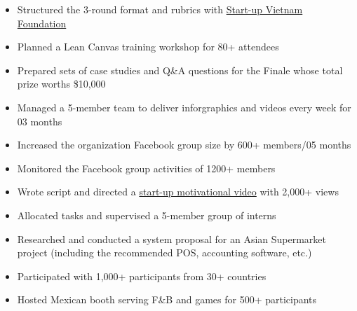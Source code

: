 \documentclass[10pt,a4paper,ragged2e]{altacv}
\begin{document}
\vskip 0.2in


\begin{itemize}
	\item Structured the 3-round format and rubrics with {\href{https://svf.org.vn/}{Start-up Vietnam Foundation}} 
	\item Planned a Lean Canvas training workshop for 80+ attendees
	\item Prepared sets of case studies and Q\&A questions for the Finale whose total prize worths \$10,000
\end{itemize}

\divider

\begin{itemize}
	\item Managed a 5-member team to deliver inforgraphics and videos every week for 03 months 
	\item Increased the organization Facebook group size by 600+ members/05 months
	\item Monitored the Facebook group activities of 1200+ members
	\item Wrote script and directed a {\href{https://www.facebook.com/uavsnsw/videos/433640800560301/}{start-up motivational video}} with 2,000+ views
\end{itemize}

\divider

\begin{itemize}
	\item Allocated tasks and supervised a 5-member group of interns
	\item Researched and conducted a system proposal for an Asian Supermarket project (including the recommended POS, accounting software, etc.)
\end{itemize}

\divider

\begin{itemize}
	\item Participated with 1,000+ participants from 30+ countries
	\item Hosted Mexican booth serving F\&B and games for 500+ participants
\end{itemize}
\end{document}

